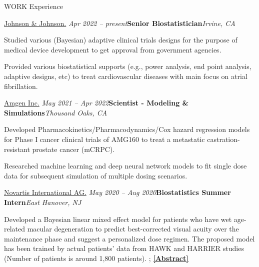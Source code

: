 \documentclass{resume} %
\begin{document}

\begin{rSection}{WORK Experience}


\begin{rSubsection}{
\href{https://www.jnjmedtech.com/en-US}{Johnson \& Johnson.}
}{\em Apr 2022 -- present}{\textbf{Senior Biostatistician}}{\em Irvine, CA}
\item Studied various (Bayesian) adaptive clinical trials designs for the purpose of medical device development to get approval from government agencies.
\item Provided various biostatistical supports (e.g., power analysis, end point analysis, adaptive designs, etc) to treat cardiovascular diseases with main focus on atrial fibrillation.
\end{rSubsection}


\begin{rSubsection}{
\href{https://www.amgen.com/}{Amgen Inc.}
}{\em May 2021 -- Apr 2022}{\textbf{Scientist - Modeling \& Simulations}}{\em Thousand Oaks, CA}
\item 
Developed Pharmacokinetics/Pharmacodynamics/Cox hazard regression models for Phase I cancer clinical trials of AMG160 to treat a metastatic castration-resistant prostate cancer (mCRPC).
\item 
Researched machine learning and deep neural network models to fit single dose data for subsequent simulation of multiple dosing scenarios. 
\end{rSubsection}

\newpage
\begin{rSubsection}{
\href{https://www.pharma.us.novartis.com/}{Novartis International AG.}
}{\em May 2020 -- Aug 2020}{\textbf{Biostatistics Summer Intern}}{\em East Hanover, NJ}
\item 
Developed a Bayesian linear mixed effect model for patients who have wet age-related macular degeneration to predict best-corrected visual acuity over the maintenance phase and suggest a personalized dose regimen. The proposed model has been trained by actual patients' data from HAWK and HARRIER studies (Number of patients is around 1,800 patients). ; \href{https://sites.google.com/view/seyoonlee/home/projects/novartis-summer-internship-project?authuser=0#h.dfc3zhswkx8m}
{\underline{\textbf{[Abstract]}}}
\end{rSubsection}


\end{rSection}
\end{document}
